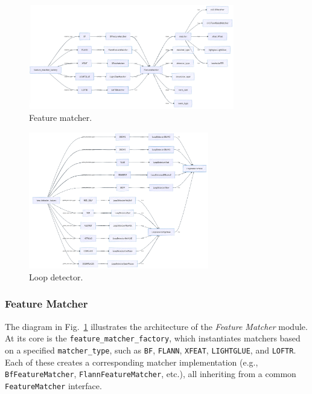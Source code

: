 \documentclass{article}
\begin{document}
\begin{figure}[!t]
\begin{center}
    \includegraphics[width=0.8\textwidth]{./images/feature_matcher.png}
\end{center}
\caption{Feature matcher.}
\label{Fig:FeatureMatcher}
\end{figure}

\begin{figure}[!t]
\begin{center}
    \includegraphics[width=0.7\textwidth]{./images/loop_detector.png}
\end{center}
\caption{Loop detector.}
\label{Fig:LoopDetector}
\end{figure}


\subsubsection{Feature Matcher}\label{Sect:FeatureMatcher}

The diagram in Fig.~\ref{Fig:FeatureMatcher} illustrates the architecture of the \textit{Feature Matcher} module. At its core is the \texttt{feature\_matcher\_factory}, which instantiates matchers based on a specified \texttt{matcher\_type}, such as \texttt{BF}, \texttt{FLANN}, \texttt{XFEAT}, \texttt{LIGHTGLUE}, and \texttt{LOFTR}. Each of these creates a corresponding matcher implementation (e.g., \texttt{BfFeatureMatcher}, \texttt{FlannFeatureMatcher}, etc.), all inheriting from a common \texttt{FeatureMatcher} interface.
\end{document}
